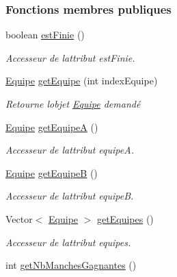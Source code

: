 \subsubsection*{Fonctions membres publiques}
\begin{DoxyCompactItemize}
\item 
boolean \hyperlink{classcom_1_1example_1_1area_1_1_rencontre_abafd9770f1e749026b7a4196648fa366}{est\+Finie} ()
\begin{DoxyCompactList}\small\item\em Accesseur de l\textquotesingle{}attribut est\+Finie. \end{DoxyCompactList}\item 
\hyperlink{classcom_1_1example_1_1area_1_1_equipe}{Equipe} \hyperlink{classcom_1_1example_1_1area_1_1_rencontre_a5bd76838a3c61a6e8e6204981218e10e}{get\+Equipe} (int index\+Equipe)
\begin{DoxyCompactList}\small\item\em Retourne l\textquotesingle{}objet \hyperlink{classcom_1_1example_1_1area_1_1_equipe}{Equipe} demandé \end{DoxyCompactList}\item 
\hyperlink{classcom_1_1example_1_1area_1_1_equipe}{Equipe} \hyperlink{classcom_1_1example_1_1area_1_1_rencontre_a207498fd691285b28b0a720da0a660f8}{get\+EquipeA} ()
\begin{DoxyCompactList}\small\item\em Accesseur de l\textquotesingle{}attribut equipeA. \end{DoxyCompactList}\item 
\hyperlink{classcom_1_1example_1_1area_1_1_equipe}{Equipe} \hyperlink{classcom_1_1example_1_1area_1_1_rencontre_a83deec026e26407049c5671672291170}{get\+EquipeB} ()
\begin{DoxyCompactList}\small\item\em Accesseur de l\textquotesingle{}attribut equipeB. \end{DoxyCompactList}\item 
Vector$<$ \hyperlink{classcom_1_1example_1_1area_1_1_equipe}{Equipe} $>$ \hyperlink{classcom_1_1example_1_1area_1_1_rencontre_a59f379be02ce6c587ad59d1b30e3c9a5}{get\+Equipes} ()
\begin{DoxyCompactList}\small\item\em Accesseur de l\textquotesingle{}attribut equipes. \end{DoxyCompactList}\item 
int \hyperlink{classcom_1_1example_1_1area_1_1_rencontre_a8f7801a28279d1fb26b0961d05c55bdd}{get\+Nb\+Manches\+Gagnantes} ()

\end{DoxyCompactItemize}
